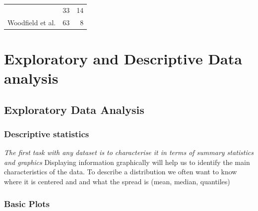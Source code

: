 \documentclass[]{book}
\begin{document}
\begin{longtable}[]{@{}lrr@{}}
\begin{minipage}[t]{0.44\columnwidth}
\end{minipage} & \begin{minipage}[t]{0.18\columnwidth}\raggedleft\strut
33\strut
\end{minipage} & \begin{minipage}[t]{0.18\columnwidth}\raggedleft\strut
14\strut
\end{minipage}\tabularnewline
\begin{minipage}[t]{0.44\columnwidth}\raggedright\strut
Woodfield et al. \citeyearpar{Woodfield81}\strut
\end{minipage} & \begin{minipage}[t]{0.18\columnwidth}\raggedleft\strut
63\strut
\end{minipage} & \begin{minipage}[t]{0.18\columnwidth}\raggedleft\strut
8\strut
\end{minipage}\tabularnewline
\bottomrule
\end{longtable}

\part{Exploratory and Descriptive Data
analysis}\label{part-exploratory-and-descriptive-data-analysis}

\chapter{Exploratory Data Analysis}\label{exploratory-data-analysis}

\section{Descriptive statistics}\label{descriptive-statistics}

\emph{The first task with any dataset is to characterise it in terms of
summary statistics and graphics } Displaying information graphically
will help us to identify the main characteristics of the data. To
describe a distribution we often want to know where it is centered and
and what the spread is (mean, median, quantiles)

\section{Basic Plots}\label{basic-plots}
\end{document}
